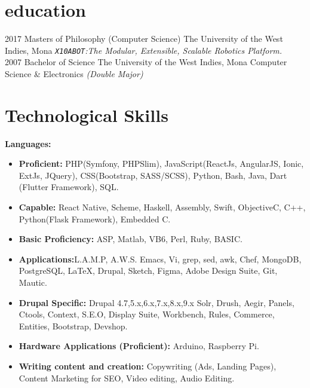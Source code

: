 \documentclass[]{friggeri-cv} %
\begin{document}
\section{education}

\begin{entrylist}
\entry
{2017}
{Masters {\normalfont of Philosophy (Computer Science)}}
{The University of the West Indies, Mona}
{\emph{\texttt{X10ABOT}:The Modular, Extensible, Scalable Robotics Platform.}} \\
\entry
{2007}
{Bachelor {\normalfont of Science}}
{The University of the West Indies, Mona}
{Computer Science \& Electronics \emph{(Double Major)}}
\end{entrylist}


\section{Technological Skills}
\textbf{Languages:}
\begin{itemize}
\item \textbf{Proficient: }PHP(Symfony, PHPSlim), JavaScript(ReactJs, AngularJS, Ionic, ExtJs, JQuery), CSS(Bootstrap, SASS/SCSS), Python, Bash, Java, Dart (Flutter Framework), SQL.
\item \textbf{Capable: } React Native, Scheme, Haskell, Assembly, Swift, Objective\-C, C++, Python(Flask Framework), Embedded C.
\item \textbf{Basic Proficiency: }ASP, Matlab, VB6, Perl, Ruby, BASIC.
\item \textbf{Applications:}L.A.M.P, A.W.S. Emacs, Vi, grep, sed, awk, Chef, MongoDB, PostgreSQL, \LaTeX, Drupal, Sketch, Figma, Adobe Design Suite, Git, Mautic.
\item \textbf{Drupal Specific: } Drupal 4.7,5.x,6.x,7.x,8.x,9.x Solr, Drush, Aegir, Panels, Ctools, Context, S.E.O, Display Suite, Workbench, Rules, Commerce, Entities, Bootstrap, Devshop.
\item \textbf{Hardware Applications (Proficient):} Arduino, Raspberry Pi.
\item \textbf{Writing content and creation:} Copywriting (Ads, Landing Pages), Content Marketing for SEO, Video editing, Audio Editing.
\end{itemize}
\end{document}
